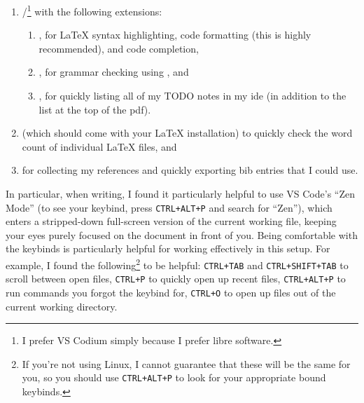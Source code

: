 \begin{enumerate}
    \item {}/\footnote{I prefer VS Codium
              simply because I prefer libre software.} with the following
          extensions:
          \begin{enumerate}
              \item {},
                    for \LaTeX{} syntax highlighting, code formatting (this
                    is highly recommended), and code completion,
              \item {}, for
                    grammar checking using
                    , and
              \item {}, for
                    quickly listing all of my TODO notes in my \acs{ide} (in addition to
                    the list at the top of the \acs{pdf}).
          \end{enumerate}
    \item {} (which
    should come with your \LaTeX{} installation) to quickly check the word count
    of individual \LaTeX{} files, and
    \item {} for collecting my
    references and quickly exporting bib entries that I could use.
\end{enumerate}

In particular, when writing, I found it particularly helpful to use VS Code's
``Zen Mode'' (to see your keybind, press \texttt{CTRL+ALT+P} and search for
``Zen''), which enters a stripped-down full-screen version of the current
working file, keeping your eyes purely focused on the document in front of you.
Being comfortable with the keybinds is particularly helpful for working
effectively in this setup. For example, I found the following\footnote{If you're
not using Linux, I cannot guarantee that these will be the same for you, so you
should use \texttt{CTRL+ALT+P} to look for your appropriate bound keybinds.} to
be helpful: \texttt{CTRL+TAB} and \texttt{CTRL+SHIFT+TAB} to scroll between open
files, \texttt{CTRL+P} to quickly open up recent files, \texttt{CTRL+ALT+P} to
run commands you forgot the keybind for, \texttt{CTRL+O} to open up files out of
the current working directory.


